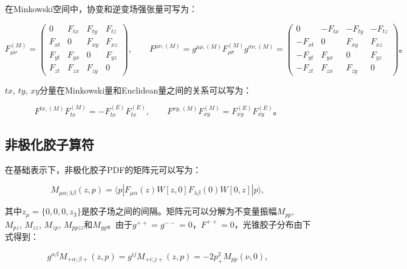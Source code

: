 \documentclass[12pt,a4paper]{ctexart}
\theoremstyle{definition}
\begin{document}
在Minkowski空间中，协变和逆变场强张量可写为：

\begin{equation}
F^{(M)}_{\mu\nu} =
\begin{pmatrix}
0   & F_{tx} & F_{ty} & F_{tz} \\
F_{xt} & 0      & F_{xy} & F_{xz} \\
F_{yt} & F_{yx} & 0       & F_{yz} \\
F_{zt} & F_{zx} & F_{zy}  & 0
\end{pmatrix},
\qquad
F^{\mu\nu,(M)} = g^{\mu\rho,(M)} F^{(M)}_{\rho\sigma} g^{\sigma\nu,(M)} =
\begin{pmatrix}
0      & -F_{tx} & -F_{ty} & -F_{tz} \\
-F_{xt} & 0       & F_{xy}  & F_{xz} \\
-F_{yt} & F_{yx}  & 0       & F_{yz} \\
-F_{zt} & F_{zx}  & F_{zy}  & 0
\end{pmatrix}。
\label{eq:F_Minkowski}
\end{equation}

$tx$, $ty$, $xy$分量在Minkowski量和Euclidean量之间的关系可以写为：

\begin{equation}
F^{tx,(M)}F^{(M)}_{tx} = -F^{(E)}_{tx}F^{(E)}_{tx}, \qquad
F^{xy,(M)}F^{(M)}_{xy} = F^{(E)}_{xy}F^{(E)}_{xy}。
\label{eq:Minkowski_Euclidean}
\end{equation}

\subsection{非极化胶子算符}

在基础表示下，非极化胶子PDF的矩阵元可以写为：

\begin{equation}
M_{\mu\alpha;\lambda\beta}(z,p) = \langle p| F_{\mu\alpha}(z) W[z,0] F_{\lambda\beta}(0) W[0,z] |p\rangle,
\label{eq:matrix_element}
\end{equation}

其中$z_\mu = \{0, 0, 0, z_3\}$是胶子场之间的间隔。矩阵元可以分解为不变量振幅$M_{pp}$, $M_{pz}$, $M_{zz}$, $M_{zp}$, $M_{ppzz}$和$M_{gg}$\cite{Balitsky2020}。由于$g^{++} = g^{--} = 0$，$F^{++} = 0$，光锥胶子分布由下式得到：

\begin{equation}
g^{\alpha\beta} M_{+\alpha;\beta+}(z,p) = g^{ij} M_{+i;j+}(z,p) = -2p^2_+ M_{pp}(\nu, 0),
\label{eq:lightcone_gluon}
\end{equation}
\end{document}
